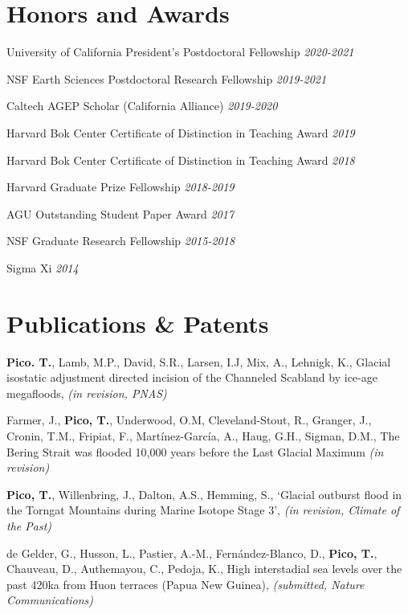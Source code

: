 \documentclass[margin,line]{res}
\newenvironment{list1}{
  \begin{list}{\ding{113}}{%
      \setlength{\itemsep}{0in}
      \setlength{\parsep}{0in} \setlength{\parskip}{0in}
      \setlength{\topsep}{0in} \setlength{\partopsep}{0in} 
      \setlength{\leftmargin}{0.00in}}}{\end{list}}
\begin{document}
\begin{resume}
\section{\sc Honors and Awards}  

\begin{list1}
\item[] University of California President's Postdoctoral Fellowship \hfill {\em 2020-2021}
\item[] NSF Earth Sciences Postdoctoral Research Fellowship \hfill {\em 2019-2021}
\item[] Caltech AGEP Scholar (California Alliance)  \hfill {\em 2019-2020}
\item[] Harvard Bok Center Certificate of Distinction in Teaching Award \hfill {\em 2019}
\item[] Harvard Bok Center Certificate of Distinction in Teaching Award \hfill {\em 2018}
\item[] Harvard Graduate Prize Fellowship \hfill {\em 2018-2019}
\item[] AGU Outstanding Student Paper Award \hfill {\em 2017}
\item[] NSF Graduate Research Fellowship \hfill {\em 2015-2018}
\item[] Sigma Xi  \hfill {\em  2014}
\end{list1}


\section{\sc Publications \& Patents} 

{\bf Pico. T.}, Lamb, M.P., David, S.R., Larsen, I.J, Mix, A., Lehnigk, K., Glacial isostatic adjustment directed incision of the Channeled Scabland by ice-age megafloods,  {\em(in revision, PNAS)}

Farmer, J., {\bf Pico, T.}, Underwood, O.M, Cleveland-Stout, R., Granger, J., Cronin, T.M., Fripiat, F., Martínez-García, A., Haug, G.H., Sigman, D.M., The Bering Strait was flooded 10,000 years before the Last Glacial Maximum {\em(in revision)}

{\bf Pico, T.}, Willenbring, J., Dalton, A.S., Hemming, S., `Glacial outburst flood in the Torngat Mountains during Marine Isotope Stage 3', {\em (in revision, Climate of the Past)}

de Gelder, G., Husson, L., Pastier, A.-M., Fernández-Blanco, D., {\bf Pico, T.}, Chauveau, D., Authemayou, C., Pedoja, K., High interstadial sea levels over the past 420ka from Huon terraces (Papua New Guinea), {\em(submitted, Nature Communications)}


\end{resume}
\end{document}
